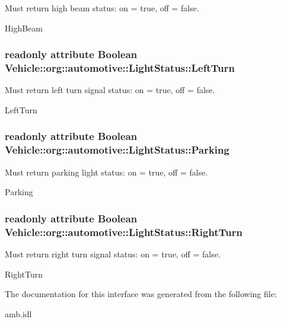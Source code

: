Must return high beam status\-: on = true, off = false. 

High\-Beam \hypertarget{interfaceVehicle_1_1org_1_1automotive_1_1LightStatus_af41a1c0b08bec3f53a4fab050c74238a}{
\subsubsection[{Left\-Turn}]{\setlength{\rightskip}{0pt plus 5cm}readonly attribute Boolean Vehicle\-::org\-::automotive\-::\-Light\-Status\-::\-Left\-Turn}}\label{interfaceVehicle_1_1org_1_1automotive_1_1LightStatus_af41a1c0b08bec3f53a4fab050c74238a}


Must return left turn signal status\-: on = true, off = false. 

Left\-Turn \hypertarget{interfaceVehicle_1_1org_1_1automotive_1_1LightStatus_af841287af3e9d7f7437102e75e4922b2}{
\subsubsection[{Parking}]{\setlength{\rightskip}{0pt plus 5cm}readonly attribute Boolean Vehicle\-::org\-::automotive\-::\-Light\-Status\-::\-Parking}}\label{interfaceVehicle_1_1org_1_1automotive_1_1LightStatus_af841287af3e9d7f7437102e75e4922b2}


Must return parking light status\-: on = true, off = false. 

Parking \hypertarget{interfaceVehicle_1_1org_1_1automotive_1_1LightStatus_a5c3e638c041a733e1df0f38775192b49}{
\subsubsection[{Right\-Turn}]{\setlength{\rightskip}{0pt plus 5cm}readonly attribute Boolean Vehicle\-::org\-::automotive\-::\-Light\-Status\-::\-Right\-Turn}}\label{interfaceVehicle_1_1org_1_1automotive_1_1LightStatus_a5c3e638c041a733e1df0f38775192b49}


Must return right turn signal status\-: on = true, off = false. 

Right\-Turn 

The documentation for this interface was generated from the following file\-:\begin{DoxyCompactItemize}
\item 
amb.\-idl\end{DoxyCompactItemize}
